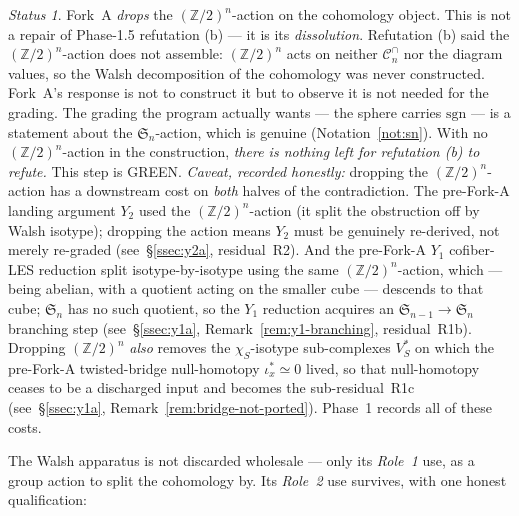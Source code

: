 \documentclass[11pt,oneside]{amsart}
\theoremstyle{plain}
\theoremstyle{definition}
\theoremstyle{remark}
\theoremstyle{honeststyle}
\newtheorem{status}[theorem]{Status}
\newcommand{\sgn}{\mathrm{sgn}}
\newcommand{\Sym}{\mathfrak{S}}
\newcommand{\Z}{\mathbb{Z}}
\newcommand{\Cn}{\mathcal{C}^{\cap}_n}
\newcommand{\walsh}[1]{\chi_{#1}}
\begin{document}
\begin{status}
\label{status:c-block}
Fork~A \emph{drops} the $(\Z/2)^n$-action on the cohomology object.
This is not a repair of Phase-1.5 refutation (b) --- it is its
\emph{dissolution}. Refutation (b) said the $(\Z/2)^n$-action does not
assemble: $(\Z/2)^n$ acts on neither $\Cn$ nor the diagram values, so
the Walsh decomposition of the cohomology was never constructed.
Fork~A's response is not to construct it but to observe it is not
needed for the grading. The grading the program actually wants --- the
sphere carries $\sgn$ --- is a statement about the $\Sym_n$-action,
which is genuine (Notation~\ref{not:sn}). With no $(\Z/2)^n$-action in
the construction, \emph{there is nothing left for refutation (b) to
refute.} This step is \textsf{GREEN}. \emph{Caveat, recorded honestly:}
dropping the $(\Z/2)^n$-action has a downstream cost on \emph{both}
halves of the contradiction. The pre-Fork-A landing argument $Y_2$
used the $(\Z/2)^n$-action (it split the obstruction off by Walsh
isotype); dropping the action means $Y_2$ must be genuinely
re-derived, not merely re-graded (see~\S\ref{ssec:y2a}, residual~R2).
And the pre-Fork-A $Y_1$ cofiber-LES reduction split
isotype-by-isotype using the same $(\Z/2)^n$-action, which --- being
abelian, with a quotient acting on the smaller cube --- descends to
that cube; $\Sym_n$ has no such quotient, so the $Y_1$ reduction
acquires an $\Sym_{n-1}\to\Sym_n$ branching step
(see~\S\ref{ssec:y1a}, Remark~\ref{rem:y1-branching}, residual~R1b).
Dropping $(\Z/2)^n$ \emph{also} removes the $\walsh{S}$-isotype
sub-complexes $V_S^{*}$ on which the pre-Fork-A twisted-bridge
null-homotopy $\iota_x^{*}\simeq0$ lived, so that null-homotopy
ceases to be a discharged input and becomes the sub-residual~R1c
(see~\S\ref{ssec:y1a}, Remark~\ref{rem:bridge-not-ported}). Phase~1
records all of these costs.
\end{status}

The Walsh apparatus is not discarded wholesale --- only its
\emph{Role~1} use, as a group action to split the cohomology by. Its
\emph{Role~2} use survives, with one honest qualification:
\end{document}
